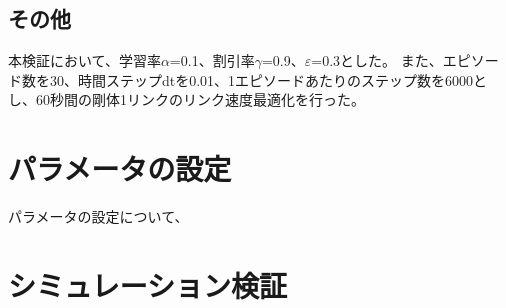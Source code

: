 \subsection{その他}
本検証において、学習率$\alpha$=0.1、割引率$\gamma$=0.9、$\varepsilon$=0.3とした。
また、エピソード数を30、時間ステップdtを0.01、1エピソードあたりのステップ数を6000とし、60秒間の剛体1リンクのリンク速度最適化を行った。
\section{パラメータの設定}
パラメータの設定について、
\section{シミュレーション検証}
